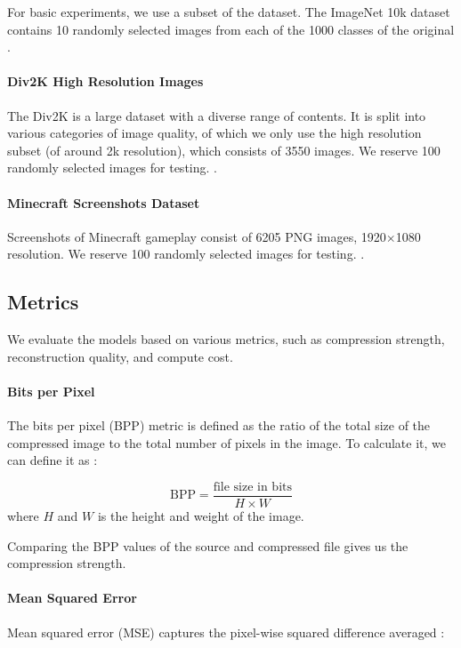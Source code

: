 \documentclass[conference]{IEEEtran}
\begin{document}
For basic experiments, we use a subset of the dataset. The ImageNet 10k dataset contains 10 randomly selected images from each of the 1000 classes of the original \cite{noauthor_imagenet_nodate}. 

\paragraph{Div2K High Resolution Images}
The Div2K is a large dataset with a diverse range of contents. It is split into various categories of image quality, of which we only use the high resolution subset (of around 2k resolution), which consists of 3550 images. We reserve 100 randomly selected images for testing. \cite{noauthor_div2k_nodate}. 

\paragraph{Minecraft Screenshots Dataset}
Screenshots of Minecraft gameplay consist of 6205 PNG images, 1920$\times$1080 resolution. We reserve 100 randomly selected images for testing. \cite{noauthor_minecraft_nodate}. 


\subsection{Metrics}
We evaluate the models based on various metrics, such as compression strength, reconstruction quality, and compute cost.

\paragraph{Bits per Pixel}
The bits per pixel (BPP) metric is defined as the ratio of the total size of the compressed image to the total number of pixels in the image. To calculate it, we can define it as \cite{ungureanu_image-compression_2024}:

\begin{equation}
    \text{BPP} = \frac{\text{file size in bits}}{H \times W}
\end{equation}
where $H$ and $W$ is the height and weight of the image.

Comparing the BPP values of the source and compressed file gives us the compression strength.

\paragraph{Mean Squared Error}
Mean squared error (MSE) captures the pixel-wise squared difference averaged \cite{ungureanu_image-compression_2024}: 
\end{document}
